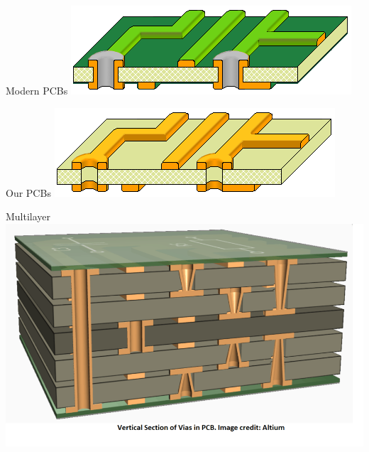 \documentclass{presentation}
\begin{document}
\begin{frame}{Modern PCBs}
  \includegraphics[width=\textwidth]{"./Double Sided PTH and masked.png"}
\end{frame}

\begin{frame}{Our PCBs}
  \includegraphics[width=\textwidth]{"./Double Sided non-PTH2.PNG"}
\end{frame}

\begin{frame}{Multilayer}
  \includegraphics[width=\textwidth]{"./multilayer.png"}
\end{frame}
\end{document}
